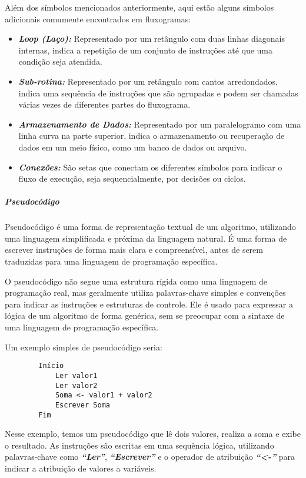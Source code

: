 \documentclass[a4paper, 12pt, onecolumn,singlespacing]{article}
\begin{document}
	Além dos símbolos mencionados anteriormente, aqui estão alguns símbolos adicionais comumente encontrados em fluxogramas:
	
	\begin{itemize}
	
		\item \textbf{\textit{Loop (Laço):}} Representado por um retângulo com duas linhas diagonais internas, indica a repetição de um conjunto de instruções até que uma condição seja atendida.
		
		\item \textbf{\textit{Sub-rotina:}} Representado por um retângulo com cantos arredondados, indica uma sequência de instruções que são agrupadas e podem ser chamadas várias vezes de diferentes partes do fluxograma.
		
		\item \textbf{\textit{Armazenamento de Dados:}} Representado por um paralelogramo com uma linha curva na parte superior, indica o armazenamento ou recuperação de dados em um meio físico, como um banco de dados ou arquivo.
		
		\item \textbf{\textit{Conexões:}} São setas que conectam os diferentes símbolos para indicar o fluxo de execução, seja sequencialmente, por decisões ou ciclos.
		
	\end{itemize}

	\subparagraph{Pseudocódigo}
	\label{pseudocodigo}
	Pseudocódigo é uma forma de representação textual de um algoritmo, utilizando uma linguagem simplificada e próxima da linguagem natural. É uma forma de escrever instruções de forma mais clara e compreensível, antes de serem traduzidas para uma linguagem de programação específica.
	
	O pseudocódigo não segue uma estrutura rígida como uma linguagem de programação real, mas geralmente utiliza palavras-chave simples e convenções para indicar as instruções e estruturas de controle. Ele é usado para expressar a lógica de um algoritmo de forma genérica, sem se preocupar com a sintaxe de uma linguagem de programação específica.
	
	Um exemplo simples de pseudocódigo seria:
	
	\begin{verbatim}
		Início
			Ler valor1
			Ler valor2
			Soma <- valor1 + valor2
			Escrever Soma
		Fim
	\end{verbatim}
	
	Nesse exemplo, temos um pseudocódigo que lê dois valores, realiza a soma e exibe o resultado. As instruções são escritas em uma sequência lógica, utilizando palavras-chave como \textbf{\textit{``Ler''}}, \textbf{\textit{``Escrever''}} e o operador de atribuição \textbf{\textit{``<-''}} para indicar a atribuição de valores a variáveis.
	
\end{document}
